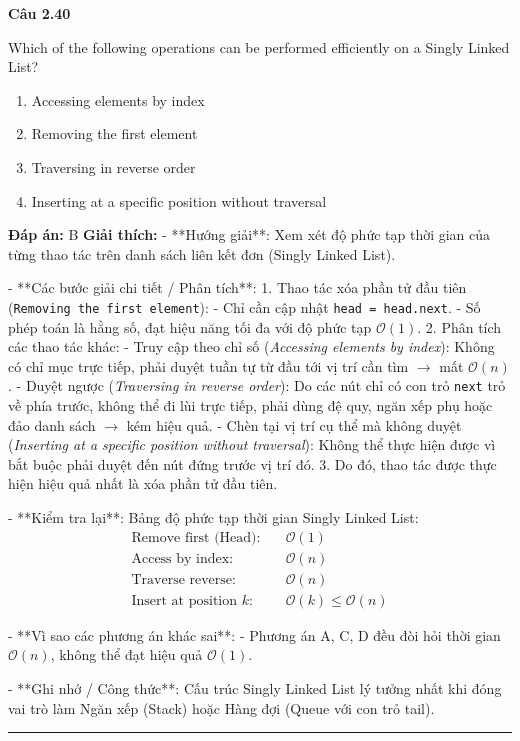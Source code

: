 \documentclass[11pt,a4paper]{article}
\newenvironment{question}[1]{%
  \par\vspace{1em}\noindent\textbf{\large Câu #1}\par\vspace{0.4em}
}{%
  \par\vspace{1em}\hrule\vspace{0.6em}
}
\newenvironment{choices}{%
  \begin{enumerate}[label=\textbf{\Alph*.},leftmargin=2.2em,itemsep=2pt,topsep=3pt]
}{%
  \end{enumerate}
}
\newcommand{\choice}{\item}
\begin{document}
\begin{question}{2.40}
Which of the following operations can be performed efficiently on a Singly Linked List?
\begin{choices}
\choice Accessing elements by index
\choice Removing the first element
\choice Traversing in reverse order
\choice Inserting at a specific position without traversal
\end{choices}
\textbf{Đáp án:} B
\textbf{Giải thích:} - **Hướng giải**:
Xem xét độ phức tạp thời gian của từng thao tác trên danh sách liên kết đơn (Singly Linked List).


- **Các bước giải chi tiết / Phân tích**:
1. Thao tác xóa phần tử đầu tiên (\texttt{Removing the first element}):
   - Chỉ cần cập nhật \texttt{head = head.next}.
   - Số phép toán là hằng số, đạt hiệu năng tối đa với độ phức tạp \(\mathcal{O}(1)\).
2. Phân tích các thao tác khác:
   - Truy cập theo chỉ số (\textit{Accessing elements by index}): Không có chỉ mục trực tiếp, phải duyệt tuần tự từ đầu tới vị trí cần tìm \(\rightarrow\) mất \(\mathcal{O}(n)\).
   - Duyệt ngược (\textit{Traversing in reverse order}): Do các nút chỉ có con trỏ \texttt{next} trỏ về phía trước, không thể đi lùi trực tiếp, phải dùng đệ quy, ngăn xếp phụ hoặc đảo danh sách \(\rightarrow\) kém hiệu quả.
   - Chèn tại vị trí cụ thể mà không duyệt (\textit{Inserting at a specific position without traversal}): Không thể thực hiện được vì bắt buộc phải duyệt đến nút đứng trước vị trí đó.
3. Do đó, thao tác được thực hiện hiệu quả nhất là xóa phần tử đầu tiên.


- **Kiểm tra lại**:
Bảng độ phức tạp thời gian Singly Linked List:
\[\begin{aligned}
\text{Remove first (Head):} & \quad \mathcal{O}(1) \\
\text{Access by index:} & \quad \mathcal{O}(n) \\
\text{Traverse reverse:} & \quad \mathcal{O}(n) \\
\text{Insert at position } k: & \quad \mathcal{O}(k) \le \mathcal{O}(n)
\end{aligned}\]


- **Vì sao các phương án khác sai**:
- Phương án A, C, D đều đòi hỏi thời gian \(\mathcal{O}(n)\), không thể đạt hiệu quả \(\mathcal{O}(1)\).


- **Ghi nhớ / Công thức**:
Cấu trúc Singly Linked List lý tưởng nhất khi đóng vai trò làm Ngăn xếp (Stack) hoặc Hàng đợi (Queue với con trỏ tail).
\end{question}
\end{document}

